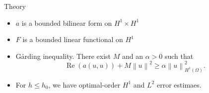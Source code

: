 \documentclass{beamer}
\begin{document}
\begin{frame}[noframenumbering]{Theory}
    \begin{itemize}
        \item<2-> $a$ is a bounded bilinear form on $H^1 \times H^1$
        \item<3-> $F$ is a bounded linear functional on $H^1$
        \item<4-> G{\aa}rding inequality. There exist $M$ and an $\alpha > 0$ such that
        \begin{equation*}
            \operatorname{Re}(a(u,u)) + M \left\| u \right\|^2 \geq \alpha \left\| u \right\|_{H^1(\Omega)}^2.
            \end{equation*}
        \item<5-> For $h \leq h_0$, we have optimal-order $H^1$ and $L^2$ error estimaes.
    \end{itemize}
\end{frame}
\end{document}
